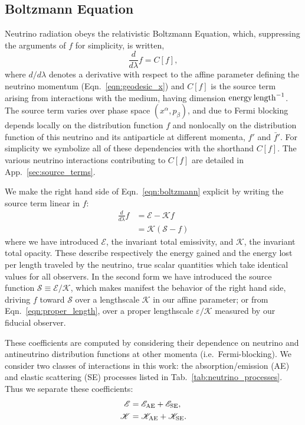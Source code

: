 \documentclass[aps,floatfix,prd,superscriptaddress,twocolumn]{revtex4-1}
\newcommand{\todo}[1]{\marginpar{\tiny{\textcolor{red}{#1}}}}
\begin{document}
\subsection{Boltzmann Equation}
\label{ssec:boltzmann}
Neutrino radiation obeys the relativistic Boltzmann Equation,
which, suppressing the arguments of $f$ for simplicity, is written,
\todo{point out limit of QKEs}
\begin{equation}
  \label{eqn:boltzmann}
  \frac{d}{d\lambda}f = C[f],
\end{equation}
where $d/d\lambda$ denotes a derivative with respect to the affine
parameter defining the neutrino momentum (Eqn.~\ref{eqn:geodesic_x})
and $C[f]$ is the source term arising from interactions with the medium,
having dimension ${\rm energy}\,{\rm length}^{-1}$.
The source term varies over phase space $(x^\alpha,p_\beta)$,
and due to Fermi blocking depends locally on the distribution function $f$
and nonlocally on the distribution function of this neutrino and its
antiparticle at different momenta, $f'$ and $\bar{f}'$.
For simplicity we symbolize all of these dependencies with the shorthand $C[f]$.
The various neutrino interactions contributing to $C[f]$ are detailed in
App.~\ref{sec:source_terms}.

We make the right hand side of Eqn.~\ref{eqn:boltzmann} explicit by writing
the source term linear in $f$:
\begin{align}
  \label{eqn:boltzmann_linear}
  \frac{d}{d\lambda}f &=
  \mathscr{E} - \mathscr{K} f \\
  \label{eqn:boltzmann_linear_s}
  &= \mathscr{K}(\mathscr{S}-f)
\end{align}
where we have introduced
$\mathscr{E}$, the invariant total emissivity, and
$\mathscr{K}$, the invariant total opacity.
These describe respectively the energy gained and the energy lost
per length traveled by the neutrino, true scalar quantities
which take identical values for all observers.
In the second form we have introduced the source function
$\mathscr{S}\equiv\mathscr{E}/\mathscr{K}$, which makes manifest the
behavior of the right hand side, driving $f$ toward $\mathscr{S}$
over a lengthscale $\mathscr{K}$ in our affine parameter;
or from Eqn.~\ref{eqn:proper_length}, over a proper lengthscale
$\varepsilon/\mathscr{K}$ measured by our fiducial observer.

These coefficients are computed by considering their dependence
on neutrino and antineutrino distribution functions at other momenta
(i.e.\ Fermi-blocking).
We consider two classes of interactions in this work:
the absorption/emission (AE) and elastic scattering (SE) processes
listed in Tab.~\ref{tab:neutrino_processes}.
Thus we separate these coefficients:
\begin{align}
  \label{eqn:inv_emissivity_components}
  \mathscr{E} &= \mathscr{E}_{\rm AE} + \mathscr{E}_{\rm SE},\\
  \label{eqn:inv_opacity_components}
  \mathscr{K} &= \mathscr{K}_{\rm AE} + \mathscr{K}_{\rm SE}.
\end{align}
\end{document}

